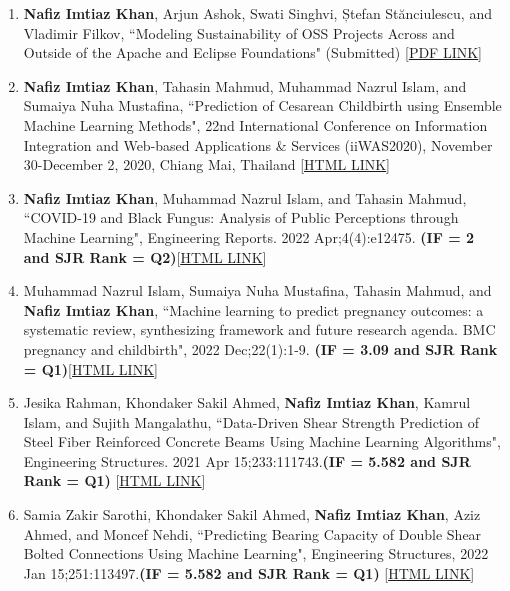 \begin{enumerate}
    \item \textbf{Nafiz Imtiaz Khan}, Arjun Ashok, Swati Singhvi, Ștefan Stănciulescu, and Vladimir Filkov, “Modeling Sustainability of OSS Projects Across and Outside of the Apache and Eclipse Foundations" (Submitted) [\href{https://drive.google.com/file/d/15HXFdyAErjZNZfHidZ66R3-bCmyXczwk/view?usp=sharing}{\underline{PDF LINK}}]



    

    \item \textbf{Nafiz Imtiaz Khan}, Tahasin Mahmud, Muhammad Nazrul Islam, and Sumaiya Nuha Mustafina, “Prediction of Cesarean Childbirth using Ensemble Machine Learning Methods", 22nd International Conference on Information Integration and Web-based Applications \& Services (iiWAS2020), November 30-December 2, 2020, Chiang Mai, Thailand [\href{https://dl.acm.org/doi/10.1145/3428757.3429138}{\underline{HTML LINK}}]

    \item  \textbf{Nafiz Imtiaz Khan}, Muhammad Nazrul Islam, and Tahasin Mahmud, “COVID-19 and Black Fungus: Analysis of Public Perceptions through Machine Learning", Engineering Reports. 2022 Apr;4(4):e12475. \textbf{(IF = 2 and SJR Rank = Q2)}[\href{https://onlinelibrary.wiley.com/doi/10.1002/eng2.12475}{\underline{HTML LINK}}]

    \item Muhammad Nazrul Islam, Sumaiya Nuha Mustafina, Tahasin Mahmud, and \textbf{Nafiz Imtiaz Khan}, “Machine learning to predict pregnancy outcomes: a systematic review, synthesizing framework and future research agenda. BMC pregnancy and childbirth", 2022 Dec;22(1):1-9. \textbf{(IF = 3.09 and SJR Rank = Q1)}[\href{https://bmcpregnancychildbirth.biomedcentral.com/articles/10.1186/s12884-022-04594-2}{\underline{HTML LINK}}]
    

    \item Jesika Rahman, Khondaker Sakil Ahmed, \textbf{Nafiz Imtiaz Khan}, Kamrul Islam, and Sujith Mangalathu, “Data-Driven Shear Strength Prediction of Steel Fiber Reinforced Concrete Beams Using Machine Learning Algorithms", Engineering Structures. 2021 Apr 15;233:111743.\textbf{(IF = 5.582 and SJR Rank = Q1)} [\href{https://www.sciencedirect.com/science/article/abs/pii/S0141029620343443}{\underline{HTML LINK}}]




    \item Samia Zakir Sarothi, Khondaker Sakil Ahmed, \textbf{Nafiz Imtiaz Khan}, Aziz Ahmed, and Moncef Nehdi, “Predicting Bearing Capacity of Double Shear Bolted Connections Using Machine Learning", Engineering Structures, 2022 Jan 15;251:113497.\textbf{(IF = 5.582 and SJR Rank = Q1)} [\href{https://www.sciencedirect.com/science/article/abs/pii/S014102962101600X"}{\underline{HTML LINK}}]


\end{enumerate}
